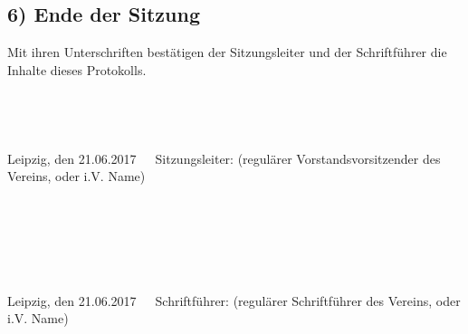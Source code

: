 \documentclass[10pt,a4paper]{scrartcl}
\newcommand{\eventdate}{21.06.2017}
\newcommand{\sitzungsleiter}{(regul{\"a}rer Vorstandsvorsitzender des Vereins, oder i.V. Name)}
\newcommand{\schriftfuehrer}{(regul{\"a}rer Schriftf{\"u}hrer des Vereins, oder i.V. Name)}
\begin{document}
\subsection*{6) Ende der Sitzung}
    Mit ihren Unterschriften best{\"a}tigen der Sitzungsleiter und der Schriftf{\"u}hrer die Inhalte dieses Protokolls.
\\
\\
\\
\\
\\
Leipzig, den \eventdate \ \ \ Sitzungsleiter: \sitzungsleiter\\
\\
\\
\\
\\
\\
\\
Leipzig, den \eventdate \ \ \ Schriftf{\"u}hrer: \schriftfuehrer
\end{document}
